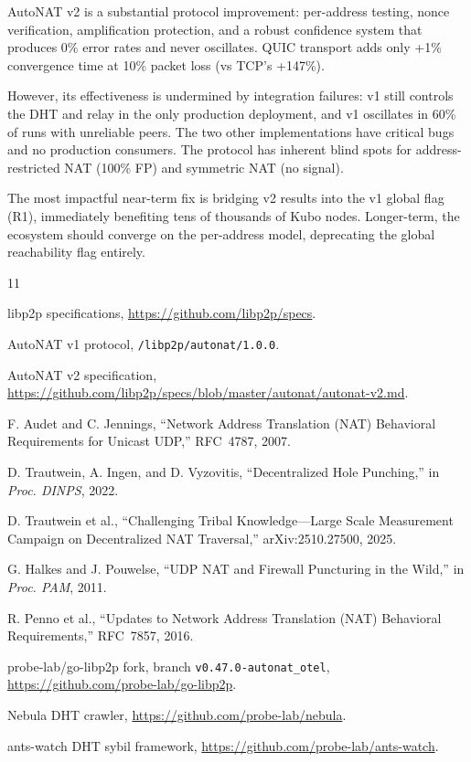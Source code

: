 \documentclass[conference]{IEEEtran}
\begin{document}
AutoNAT v2 is a substantial protocol improvement: per-address testing, nonce verification, amplification protection, and a robust confidence system that produces 0\% error rates and never oscillates. QUIC transport adds only +1\% convergence time at 10\% packet loss (vs TCP's +147\%).

However, its effectiveness is undermined by integration failures: v1 still controls the DHT and relay in the only production deployment, and v1 oscillates in 60\% of runs with unreliable peers. The two other implementations have critical bugs and no production consumers. The protocol has inherent blind spots for address-restricted NAT (100\% FP) and symmetric NAT (no signal).

The most impactful near-term fix is bridging v2 results into the v1 global flag (R1), immediately benefiting tens of thousands of Kubo nodes. Longer-term, the ecosystem should converge on the per-address model, deprecating the global reachability flag entirely.

\balance

\begin{thebibliography}{11}

libp2p specifications, \url{https://github.com/libp2p/specs}.

AutoNAT v1 protocol, \texttt{/libp2p/autonat/1.0.0}.

AutoNAT v2 specification, \url{https://github.com/libp2p/specs/blob/master/autonat/autonat-v2.md}.

F. Audet and C. Jennings, ``Network Address Translation (NAT) Behavioral Requirements for Unicast UDP,'' RFC~4787, 2007.

D. Trautwein, A. Ingen, and D. Vyzovitis, ``Decentralized Hole Punching,'' in \emph{Proc. DINPS}, 2022.

D. Trautwein et al., ``Challenging Tribal Knowledge---Large Scale Measurement Campaign on Decentralized NAT Traversal,'' arXiv:2510.27500, 2025.

G. Halkes and J. Pouwelse, ``UDP NAT and Firewall Puncturing in the Wild,'' in \emph{Proc. PAM}, 2011.

R. Penno et al., ``Updates to Network Address Translation (NAT) Behavioral Requirements,'' RFC~7857, 2016.

probe-lab/go-libp2p fork, branch \texttt{v0.47.0-autonat\_otel}, \url{https://github.com/probe-lab/go-libp2p}.

Nebula DHT crawler, \url{https://github.com/probe-lab/nebula}.

ants-watch DHT sybil framework, \url{https://github.com/probe-lab/ants-watch}.

\end{thebibliography}
\end{document}
